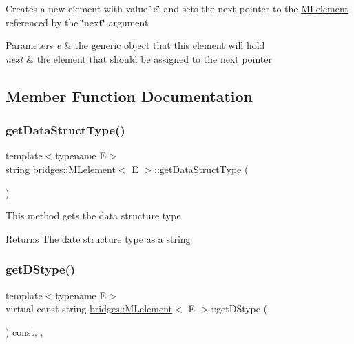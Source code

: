 Creates a new element with value \char`\"{}e\char`\"{} and sets the next pointer to the \mbox{\hyperlink{classbridges_1_1_m_lelement}{M\+Lelement}} referenced by the \char`\"{}next\char`\"{} argument


\begin{DoxyParams}{Parameters}
{\em e} & the generic object that this element will hold \\
\hline
{\em next} & the element that should be assigned to the next pointer \\
\hline
\end{DoxyParams}


\subsection{Member Function Documentation}
\mbox{\label{classbridges_1_1_m_lelement_a49e5d132e80531f005e1d2da666f0c39}} 
\subsubsection{\texorpdfstring{get\+Data\+Struct\+Type()}{getDataStructType()}}
{\footnotesize\ttfamily template$<$typename E$>$ \\
string \mbox{\hyperlink{classbridges_1_1_m_lelement}{bridges\+::\+M\+Lelement}}$<$ E $>$\+::get\+Data\+Struct\+Type (\begin{DoxyParamCaption}{ }\end{DoxyParamCaption})\hspace{0.3cm}{\ttfamily [inline]}}

This method gets the data structure type

\begin{DoxyReturn}{Returns}
The date structure type as a string 
\end{DoxyReturn}
\mbox{\label{classbridges_1_1_m_lelement_af6e8a50c38e6481ce2c569d0174c564e}} 
\subsubsection{\texorpdfstring{get\+D\+Stype()}{getDStype()}}
{\footnotesize\ttfamily template$<$typename E$>$ \\
virtual const string \mbox{\hyperlink{classbridges_1_1_m_lelement}{bridges\+::\+M\+Lelement}}$<$ E $>$\+::get\+D\+Stype (\begin{DoxyParamCaption}{ }\end{DoxyParamCaption}) const\hspace{0.3cm}{\ttfamily [inline]}, {\ttfamily [override]}, {\ttfamily [virtual]}}

